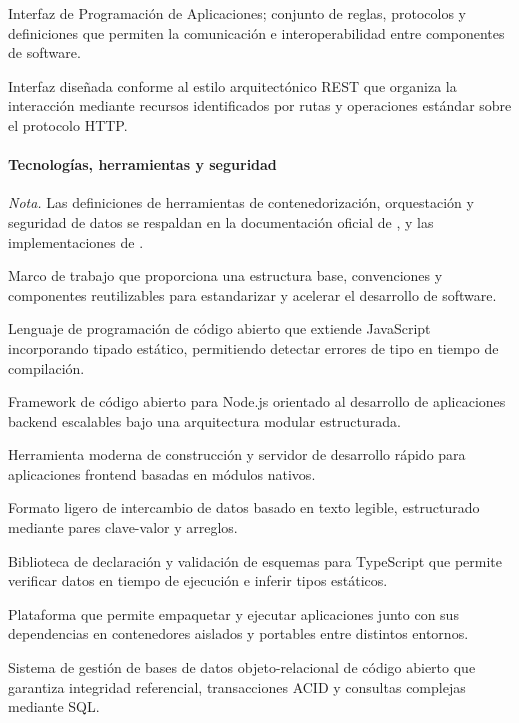     Interfaz de Programación de Aplicaciones; conjunto de reglas, protocolos y definiciones que permiten la comunicación e interoperabilidad entre componentes de software.

    Interfaz diseñada conforme al estilo arquitectónico REST que organiza la interacción mediante recursos 
    identificados por rutas y operaciones estándar sobre el protocolo HTTP.


\paragraph{Tecnologías, herramientas y seguridad}

\noindent\textit{Nota.} Las definiciones de herramientas de contenedorización, orquestación y seguridad de datos se respaldan 
en la documentación oficial de \textcite{dockerOverview}, \textcite{n8n} y las implementaciones de \textcite{chattopadhyay2026ai}.

    Marco de trabajo que proporciona una estructura base, convenciones y componentes reutilizables para estandarizar y acelerar el desarrollo de software.

    Lenguaje de programación de código abierto que extiende JavaScript incorporando tipado estático, permitiendo detectar errores de tipo en tiempo de compilación.

    Framework de código abierto para Node.js orientado al desarrollo de aplicaciones backend escalables bajo una arquitectura modular estructurada.

    Herramienta moderna de construcción y servidor de desarrollo rápido para aplicaciones frontend basadas en módulos nativos.

    Formato ligero de intercambio de datos basado en texto legible, estructurado mediante pares clave-valor y arreglos.

    Biblioteca de declaración y validación de esquemas para TypeScript que permite verificar datos en tiempo de ejecución e inferir tipos estáticos.

    Plataforma que permite empaquetar y ejecutar aplicaciones junto con sus dependencias en contenedores aislados y portables entre distintos entornos.

    Sistema de gestión de bases de datos objeto-relacional de código abierto que garantiza integridad referencial, transacciones ACID y consultas complejas mediante SQL.

